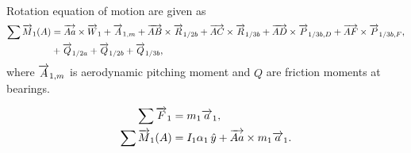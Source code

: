 Rotation equation of motion are given as
\begin{align}
    \sum \overrightarrow{M}_1(A) &= \overrightarrow{Aa} \times \overrightarrow{W}_1 + \overrightarrow{A}_{1,m} + \overrightarrow{AB} \times \overrightarrow{R}_{1/2b} + \overrightarrow{AC} \times \overrightarrow{R}_{1/3b} + \overrightarrow{AD} \times \overrightarrow{P}_{1/3b, D} + \overrightarrow{AF} \times \overrightarrow{P}_{1/3b, F}, \\
    &+ \overrightarrow{Q}_{1/2a} + \overrightarrow{Q}_{1/2b} + \overrightarrow{Q}_{1/3b},
\end{align}
where $\overrightarrow{A}_{1,m}$ is aerodynamic pitching moment and $Q$ are friction moments at bearings.


\begin{align}
    \sum\overrightarrow{F}_1 &= m_1\overrightarrow{a}_1, \\
    \sum\overrightarrow{M}_1(A) &= I_1\alpha_1\,\hat y + \overrightarrow{Aa}\times m_1\overrightarrow{a}_1.
\end{align}

